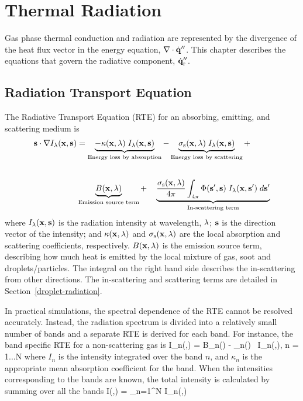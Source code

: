 

\chapter{Thermal Radiation}
\label{chapter:radiation}

Gas phase thermal conduction and radiation are represented by the divergence of the heat flux vector in the energy equation, $\nabla \cdot \dot{\mathbf{q}}''$. This chapter describes the equations that govern the radiative component, $\dot{\mathbf{q}}''_{\rm r}$.


\section{Radiation Transport Equation}
\label{RTEsection}

The Radiative Transport Equation (RTE) for an absorbing, emitting, and scattering medium is \cite{Viskanta:1987}
\begin{align}
{\mathbf{s}} \cdot \nabla I_{\lambda}({\mathbf{x}},{\mathbf{s}}) &=
\underbrace{ - \kappa({\mathbf{x}},\lambda)   \; I_\lambda({\mathbf{x}},{\mathbf{s}}) }_{\textrm{Energy loss by absorption}} -
\underbrace{\sigma_{\rm s}({\mathbf{x}},\lambda) \; I_\lambda({\mathbf{x}},{\mathbf{s}}) }_{\textrm{Energy loss by scattering}} +  \notag \\[0.25in]
& \underbrace{   B({\mathbf{x}},\lambda) }_{\textrm{Emission source term}} + \quad
\underbrace{   \frac{\sigma_{\rm s}({\mathbf{x}},\lambda)}{4\pi}
\int_{4\pi}\Phi({\mathbf{s}}',{\mathbf{s}}) \; I_{\lambda}({\mathbf{x}},{\mathbf{s}}') \; d{\mathbf{s}}'
 }_{\textrm{In-scattering term}}
\label{RTEbasic}
\end{align}
where $I_{\lambda}({\mathbf{x}},{\mathbf{s}})$ is the radiation intensity at wavelength, $\lambda$; ${\mathbf{s}}$ is the direction vector of the intensity; and $\kappa({\mathbf{x}},\lambda)$ and $\sigma_{\rm s}({\mathbf{x}},\lambda)$ are the local absorption and scattering coefficients, respectively. $B({\mathbf{x}},\lambda)$ is the emission source term, describing how much heat is emitted by the local mixture of gas, soot and droplets/particles. The integral on the right hand side describes the in-scattering from other directions. The in-scattering and scattering terms are detailed in Section~\ref{droplet-radiation}.

In practical simulations, the spectral dependence of the RTE cannot be resolved accurately. Instead, the radiation spectrum is divided into a relatively small number of bands and a separate RTE is derived for each band. For instance, the band specific RTE for a non-scattering gas is
\be
   \bs \cdot \nabla I_n(\bx,\bs) = B_n(\bx) - \kappa_n(\bx) \, I_n(\bx,\bs),\;\; n = 1...N  \label{bandRTE}
\ee
where $I_n$ is the intensity integrated over the band $n$, and $\kappa_n$ is the appropriate mean absorption coefficient for the band. When the intensities corresponding to the bands are known, the total intensity is calculated by summing over all the bands
\be
   I(\bx,\bs) = \sum_{n=1}^N I_n(\bx,\bs)
\ee

